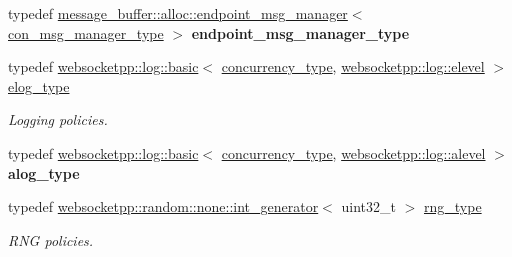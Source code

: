 \begin{DoxyCompactItemize}
\item 
\mbox{\label{structwebsocketpp_1_1config_1_1debug__core_a02b1cc8ce11213011104049aeba57866}} 
typedef \mbox{\hyperlink{classwebsocketpp_1_1message__buffer_1_1alloc_1_1endpoint__msg__manager}{message\+\_\+buffer\+::alloc\+::endpoint\+\_\+msg\+\_\+manager}}$<$ \mbox{\hyperlink{classwebsocketpp_1_1message__buffer_1_1alloc_1_1con__msg__manager}{con\+\_\+msg\+\_\+manager\+\_\+type}} $>$ {\bfseries endpoint\+\_\+msg\+\_\+manager\+\_\+type}
\item 
\mbox{\label{structwebsocketpp_1_1config_1_1debug__core_acfa1ded7f80d6a7276b0ec3fd0859fc3}} 
typedef \mbox{\hyperlink{classwebsocketpp_1_1log_1_1basic}{websocketpp\+::log\+::basic}}$<$ \mbox{\hyperlink{classwebsocketpp_1_1concurrency_1_1basic}{concurrency\+\_\+type}}, \mbox{\hyperlink{structwebsocketpp_1_1log_1_1elevel}{websocketpp\+::log\+::elevel}} $>$ \mbox{\hyperlink{structwebsocketpp_1_1config_1_1debug__core_acfa1ded7f80d6a7276b0ec3fd0859fc3}{elog\+\_\+type}}
\begin{DoxyCompactList}\small\item\em Logging policies. \end{DoxyCompactList}\item 
\mbox{\label{structwebsocketpp_1_1config_1_1debug__core_a2e57e38001385110ce0fbbd17af6b0af}} 
typedef \mbox{\hyperlink{classwebsocketpp_1_1log_1_1basic}{websocketpp\+::log\+::basic}}$<$ \mbox{\hyperlink{classwebsocketpp_1_1concurrency_1_1basic}{concurrency\+\_\+type}}, \mbox{\hyperlink{structwebsocketpp_1_1log_1_1alevel}{websocketpp\+::log\+::alevel}} $>$ {\bfseries alog\+\_\+type}
\item 
\mbox{\label{structwebsocketpp_1_1config_1_1debug__core_ae59c72992beaef76957c8bfe407394e8}} 
typedef \mbox{\hyperlink{classwebsocketpp_1_1random_1_1none_1_1int__generator}{websocketpp\+::random\+::none\+::int\+\_\+generator}}$<$ uint32\+\_\+t $>$ \mbox{\hyperlink{structwebsocketpp_1_1config_1_1debug__core_ae59c72992beaef76957c8bfe407394e8}{rng\+\_\+type}}
\begin{DoxyCompactList}\small\item\em R\+NG policies. \end{DoxyCompactList}\item 

\end{DoxyCompactItemize}
